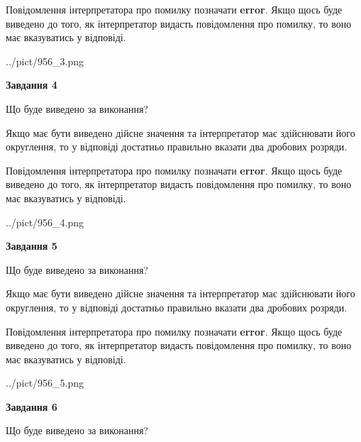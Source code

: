 \documentclass[12pt, ukrainian]{article}
\begin{document}
{\begin {Large}
Повідомлення інтерпретатора про помилку позначати \textbf{error}.
Якщо щось буде виведено до того, як інтерпретатор видасть повідомлення про помилку, 
то воно має вказуватись у відповіді. \par

\begin{center}
	{../pict/956_3.png}
\end{center}
\newpage

{\begin {center}\textbf{Завдання 4}\end {center}}\par
Що буде виведено за виконання? \par

Якщо має бути виведено дійсне значення та інтерпретатор має здійснювати його округлення, 
то у відповіді достатньо правильно вказати два дробових розряди.

Повідомлення інтерпретатора про помилку позначати \textbf{error}.
Якщо щось буде виведено до того, як інтерпретатор видасть повідомлення про помилку, 
то воно має вказуватись у відповіді. \par

\begin{center}
	{../pict/956_4.png}
\end{center}
\newpage

{\begin {center}\textbf{Завдання 5}\end {center}}\par
Що буде виведено за виконання? \par

Якщо має бути виведено дійсне значення та інтерпретатор має здійснювати його округлення, 
то у відповіді достатньо правильно вказати два дробових розряди.

Повідомлення інтерпретатора про помилку позначати \textbf{error}.
Якщо щось буде виведено до того, як інтерпретатор видасть повідомлення про помилку, 
то воно має вказуватись у відповіді. \par

\begin{center}
	{../pict/956_5.png}
\end{center}
\newpage

{\begin {center}\textbf{Завдання 6}\end {center}}\par
Що буде виведено за виконання? \par


\end{Large}}
\end{document}
